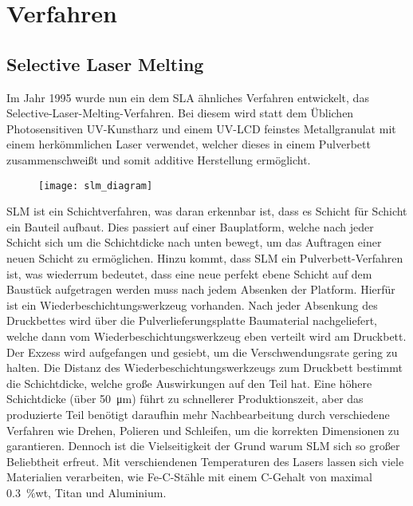 \documentclass[../main.tex]{subfiles}
\begin{document}
\section{Verfahren}
\subsection{Selective Laser Melting}
Im Jahr 1995 wurde nun ein dem SLA ähnliches Verfahren entwickelt, das Selective-Laser-Melting-Verfahren. Bei diesem wird statt dem Üblichen Photosensitiven UV-Kunstharz und einem UV-LCD feinstes Metallgranulat mit einem herkömmlichen Laser verwendet, welcher dieses in einem Pulverbett zusammenschweißt und somit additive Herstellung ermöglicht. \parencite{3FAKTUR_1}
\begin{figure}[h]
\begin{center}
	\texttt{[image: slm\_diagram]}
	\label{img:slm_diagram}
\end{center}
\end{figure}	
SLM ist ein Schichtverfahren, was daran erkennbar ist, dass es Schicht für Schicht ein Bauteil aufbaut. Dies passiert auf einer Bauplatform, welche nach jeder Schicht sich um die Schichtdicke nach unten bewegt, um das Auftragen einer neuen Schicht zu ermöglichen. 
Hinzu kommt, dass SLM ein Pulverbett-Verfahren ist, was wiederrum bedeutet, dass eine neue perfekt ebene Schicht auf dem Baustück aufgetragen werden muss nach jedem Absenken der Platform.
Hierfür ist ein Wiederbeschichtungswerkzeug vorhanden. Nach jeder Absenkung des Druckbettes wird über die Pulverlieferungsplatte Baumaterial nachgeliefert, welche dann vom Wiederbeschichtungswerkzeug eben verteilt wird am Druckbett. Der Exzess wird aufgefangen und gesiebt, um die Verschwendungsrate gering zu halten. 
Die Distanz des Wiederbeschichtungswerkzeugs zum Druckbett bestimmt die Schichtdicke, welche große Auswirkungen auf den Teil hat. Eine höhere Schichtdicke (über \qty{50}{\micro\meter}) führt zu schnellerer Produktionszeit, aber das produzierte Teil benötigt daraufhin mehr Nachbearbeitung durch verschiedene Verfahren wie Drehen, Polieren und Schleifen, um die korrekten Dimensionen zu garantieren.
Dennoch ist die Vielseitigkeit der Grund warum SLM sich so großer Beliebtheit erfreut. Mit verschiendenen Temperaturen des Lasers lassen sich viele Materialien verarbeiten, wie Fe-C-Stähle mit einem C-Gehalt von maximal \qty{0.3}{\percent}wt, Titan und Aluminium.
\end{document}
